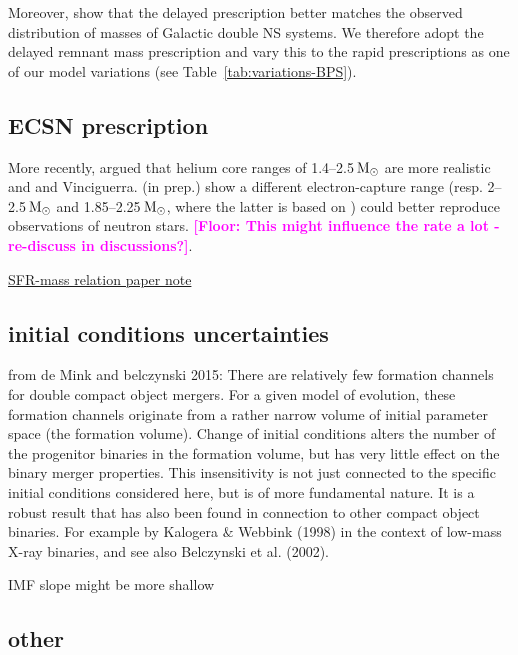 \documentclass[twocolumn]{aastex63}
\newcommand{\floor}[1]{\textbf{\textcolor{magenta}{[Floor: #1]}}}
\newcommand{\Msun}{\ensuremath{\,\rm{M}_{\odot}}\xspace}
\begin{document}
Moreover, \citet{2018MNRAS.481.4009V} show that the delayed prescription better matches the observed distribution of masses of Galactic double \ac{NS} systems. 
We  therefore adopt the delayed remnant mass prescription and vary this to the rapid prescriptions as one of our model variations (see Table~\ref{tab:variations-BPS}). \\
	


\subsection{ECSN prescription}

More recently, \citet{2004ApJ...612.1044P} argued  that helium core ranges of 1.4--2.5\Msun are more realistic and \citet{2015ApJ...801...32A} and Vinciguerra. (in prep.) show a different electron-capture range (resp. 2--2.5\Msun and 1.85--2.25\Msun, where the latter is based on \citealt{2008ApJS..174..223B}) could better reproduce observations of neutron stars. \floor{This might influence the rate a lot - re-discuss in discussions?}. 



\href{https://arxiv.org/abs/2001.06025}{SFR-mass relation paper note} \citep{2020arXiv200106025K}
\subsection{initial conditions uncertainties}
from de Mink and belczynski 2015: There are relatively few formation channels for double compact object mergers. For a given model of evolution, these formation channels originate from a rather narrow volume of initial parameter space (the formation volume). Change of initial conditions alters the number of the progenitor binaries in the formation volume, but has very little effect on the binary merger properties. This insensitivity is not just connected to the specific initial conditions considered here, but is of more fundamental nature. It is a robust result that has also been found in connection to other compact object binaries. For example by Kalogera $\&$ Webbink (1998) in the context of low-mass X-ray binaries, and see also Belczynski et al. (2002).

IMF slope might be more shallow \citep{2018Sci...359...69S}

\subsection{other}
\end{document}
